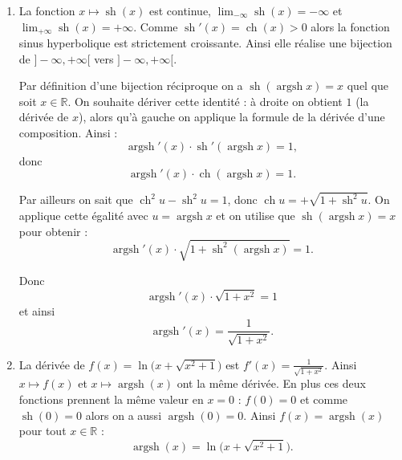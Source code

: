 \documentclass[11pt,a4paper]{article}
\newcommand{\Rr}{\mathbb{R}} \newcommand{\R}{\mathbb{R}}
\newcommand{\ch}{\mathop{\mathrm{ch}}\nolimits}
\newcommand{\sh}{\mathop{\mathrm{sh}}\nolimits}
\newcommand{\Argsh}{\mathop{\mathrm{argsh}}\nolimits}
\theoremstyle{exostyle}
\begin{document}
\begin{enumerate}
\begin{center}
\begin{minipage}{0.4\textwidth}
	\end{minipage}
	\end{center}
	
	
	\item 
	La fonction $x \mapsto \sh(x)$ est continue, $\lim_{-\infty} \sh(x) = -\infty$ et $\lim_{+\infty} \sh(x) = +\infty$. Comme $\sh'(x)=\ch(x)>0$ alors la fonction sinus hyperbolique est strictement croissante. Ainsi elle réalise une bijection de $]-\infty,+\infty[$ vers $]-\infty,+\infty[$.
	
	Par définition d'une bijection réciproque on a $\sh(\Argsh x) = x$ quel que soit $x\in\Rr$.
	On souhaite dériver cette identité : à droite on obtient $1$ (la dérivée de $x$), alors qu'à
	gauche on applique la formule de la dérivée d'une composition. Ainsi :
	\[\Argsh'(x) \cdot \sh'(\Argsh x) = 1, \]
	donc
	\[\Argsh'(x) \cdot \ch(\Argsh x) = 1. \]
	
	Par ailleurs on sait que $\ch^2 u -\sh^2 u = 1$, donc $\ch u = +\sqrt{1+\sh^2 u}$.
	On applique cette égalité avec $u = \Argsh x$ et on utilise que $\sh(\Argsh x) = x$ pour obtenir :
	\[\Argsh'(x) \cdot \sqrt{1+\sh^2(\Argsh x)} = 1.\]
	
	Donc 	\[\Argsh'(x) \cdot  \sqrt{1+x^2} = 1\]
	et ainsi
	\[\Argsh'(x) = \frac{1}{\sqrt{1+x^2}}.\]
	
	\item La dérivée de $f(x)=\ln\big(x+ \sqrt{x^2+1}\big)$ est $f'(x) = \frac{1}{\sqrt{1+x^2}}$.
	Ainsi $x \mapsto f(x)$ et $x \mapsto \Argsh(x)$ ont la même dérivée.
	En plus ces deux fonctions prennent la même valeur en $x=0$ : $f(0) = 0$ et comme $\sh(0)=0$ alors on a aussi $\Argsh(0)=0$. Ainsi $f(x)=\Argsh(x)$ pour tout $x\in\Rr$ :
	\[ \Argsh(x) = \ln\big(x+ \sqrt{x^2+1}\big). \]
	\end{enumerate}
\fincorrection	
	
\end{document}
